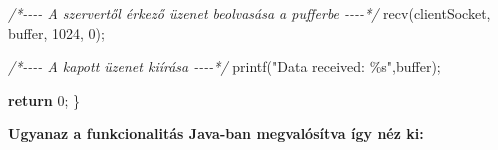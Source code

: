 \documentclass[
]{article}
\newenvironment{Shaded}{}{}
\newcommand{\CommentTok}[1]{\textcolor[rgb]{0.38,0.63,0.69}{\textit{#1}}}
\newcommand{\ControlFlowTok}[1]{\textcolor[rgb]{0.00,0.44,0.13}{\textbf{#1}}}
\newcommand{\DecValTok}[1]{\textcolor[rgb]{0.25,0.63,0.44}{#1}}
\newcommand{\NormalTok}[1]{#1}
\newcommand{\OperatorTok}[1]{\textcolor[rgb]{0.40,0.40,0.40}{#1}}
\newcommand{\SpecialCharTok}[1]{\textcolor[rgb]{0.25,0.44,0.63}{#1}}
\newcommand{\StringTok}[1]{\textcolor[rgb]{0.25,0.44,0.63}{#1}}
\begin{document}
\begin{Shaded}
\begin{Highlighting}[]
  \CommentTok{/*{-}{-}{-}{-} A szervertől érkező üzenet beolvasása a pufferbe {-}{-}{-}{-}*/}
\NormalTok{  recv}\OperatorTok{(}\NormalTok{clientSocket}\OperatorTok{,}\NormalTok{ buffer}\OperatorTok{,} \DecValTok{1024}\OperatorTok{,} \DecValTok{0}\OperatorTok{);}

  \CommentTok{/*{-}{-}{-}{-} A kapott üzenet kiírása {-}{-}{-}{-}*/}
\NormalTok{  printf}\OperatorTok{(}\StringTok{"Data received: }\SpecialCharTok{\%s}\StringTok{"}\OperatorTok{,}\NormalTok{buffer}\OperatorTok{);}

  \ControlFlowTok{return} \DecValTok{0}\OperatorTok{;}
\OperatorTok{\}}
\end{Highlighting}
\end{Shaded}

\textbf{Ugyanaz a funkcionalitás Java-ban megvalósítva így néz ki:}
\end{document}
